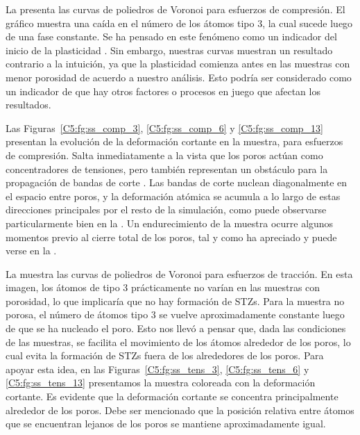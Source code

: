 La  presenta las curvas de poliedros de Voronoi para esfuerzos de compresión. El gráfico muestra una caída en el número
de los átomos tipo 3, la cual sucede luego de una fase constante. Se ha pensado en este fenómeno como un indicador del inicio de la plasticidad
\citep{arman10}. Sin embargo, nuestras curvas muestran un resultado contrario a la intuición, ya que la plasticidad comienza antes en las muestras con menor
porosidad de acuerdo a nuestro análisis. Esto podría ser considerado como un indicador de que hay otros factores o procesos en juego que afectan
los resultados.

Las Figuras~\ref{C5:fg:ss_comp_3}, \ref{C5:fg:ss_comp_6} y \ref{C5:fg:ss_comp_13} presentan la evolución de la deformación cortante en la muestra, para esfuerzos de compresión.
Salta inmediatamente a la vista que los poros actúan como concentradores de tensiones, pero también representan un obstáculo para la
propagación de bandas de corte \citep{wang10}. Las bandas de corte nuclean diagonalmente en el espacio entre poros, y la deformación atómica
se acumula a lo largo de estas direcciones principales por el resto de la simulación, como puede observarse particularmente bien en la . Un endurecimiento de la muestra ocurre algunos momentos previo al cierre total de los poros, tal y como ha apreciado \cite{yuan14} y puede verse en la .

La  muestra las curvas de poliedros de Voronoi para esfuerzos de tracción. En esta imagen, los átomos de tipo 3
prácticamente no varían en las muestras con porosidad, lo que implicaría que no hay formación de STZs.
Para la muestra no porosa, el número de átomos tipo 3 se vuelve aproximadamente constante luego de que se ha nucleado el poro. Esto
nos llevó a pensar que, dada las condiciones de las muestras, se facilita el movimiento de los átomos alrededor de los poros, lo cual evita
la formación de STZs fuera de los alrededores de los poros. Para apoyar esta idea, en las Figuras~\ref{C5:fg:ss_tens_3}, \ref{C5:fg:ss_tens_6} y \ref{C5:fg:ss_tens_13} presentamos
la muestra coloreada con la deformación cortante. Es evidente que la deformación cortante se concentra principalmente alrededor
de los poros. Debe ser mencionado que la posición relativa entre átomos que se encuentran lejanos de los poros se mantiene aproximadamente igual.

